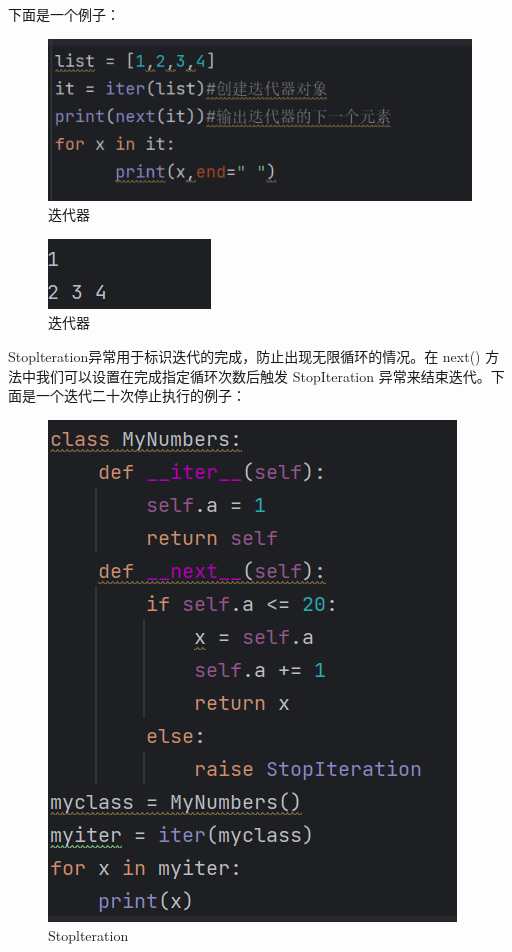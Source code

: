 \documentclass{ctexart}
\begin{document}
	下面是一个例子：
	
	\begin{figure}[H]
	    \centering
	    \includegraphics[scale=0.5]{3.55}
	    \caption{迭代器}
    \end{figure}

    \begin{figure}[H]
	    \centering
	    \includegraphics[scale=0.5]{3.56}
	    \caption{迭代器}
    \end{figure}
    
    Stoplteration异常用于标识迭代的完成，防止出现无限循环的情况。在 next() 方法中我们可以设置在完成指定循环次数后触发 StopIteration 异常来结束迭代。下面是一个迭代二十次停止执行的例子：
    
    \begin{figure}[H]
    	\centering
    	\includegraphics[scale=0.5]{3.57}
    	\caption{Stoplteration}
    \end{figure}
    
\end{document}
